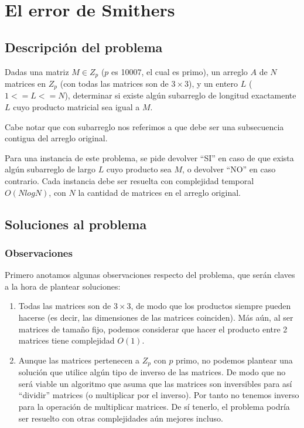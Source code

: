 \newpage{}
\section{El error de Smithers}
\subsection{Descripción del problema}
Dadas una matriz $M\in Z_p$ ($p$ es 10007, el cual es primo), un arreglo 
$A$ de $N$ matrices en $Z_p$ (con todas las matrices son de $3 \times 3$), 
y un entero $L$ ($1 <= L <= N$), determinar si existe algún subarreglo 
de longitud exactamente $L$ cuyo producto matricial 
sea igual a $M$. 

Cabe notar que con subarreglo nos referimos a que debe ser una 
subsecuencia contigua del arreglo original. 

Para una instancia de este problema, se pide devolver ``SI'' en 
caso de que exista algún subarreglo de largo $L$ cuyo producto sea $M$, o devolver 
``NO'' en caso contrario. Cada instancia debe ser resuelta con complejidad temporal 
$O(N log N)$, con $N$ 
la cantidad de matrices en el arreglo original. 

\subsection{Soluciones al problema}
\subsubsection{Observaciones}

Primero anotamos algunas observaciones respecto del problema, que serán claves a la
hora de plantear soluciones: 
\begin{enumerate}
    \item Todas las matrices son de $3 \times 3$, de modo que los productos siempre pueden 
    hacerse (es decir, las dimensiones de las matrices coinciden). Más aún, al ser matrices 
    de tamaño fijo, podemos considerar que hacer el producto entre 2 matrices tiene 
    complejidad $O(1)$. 
    \item Aunque las matrices pertenecen a $Z_p$ con $p$ primo, 
    no podemos plantear una solución que utilice algún tipo de inverso de las matrices. 
    De modo que no será viable un algoritmo que asuma que las matrices son inversibles para 
    así ``dividir'' matrices (o multiplicar por el inverso). Por tanto no tenemos inverso para la 
    operación de multiplicar matrices. De sí tenerlo, el problema podría ser resuelto con 
    otras complejidades aún mejores incluso. 
\end{enumerate}

